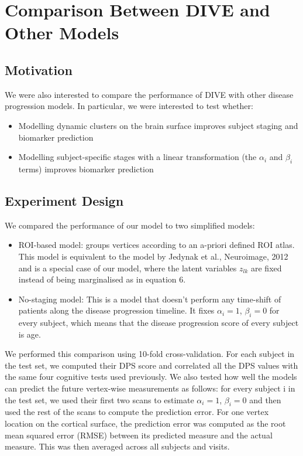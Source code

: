 \section{Comparison Between DIVE and Other Models}
\label{sec:diveCompAppendix}
 
\subsection{Motivation}

We were also interested to compare the performance of DIVE with other disease progression models. In particular, we were interested to test whether:
\begin{itemize}
 \item Modelling dynamic clusters on the brain surface improves subject staging and biomarker prediction
 \item Modelling subject-specific stages with a linear transformation (the $\alpha_i$ and $\beta_i$ terms) improves biomarker prediction
\end{itemize}


\subsection{Experiment Design}

We compared the performance of our model to two simplified models:
\begin{itemize}
 \item ROI-based model: groups vertices according to an a-priori defined ROI atlas. This model is equivalent to the model by Jedynak et al., Neuroimage, 2012 and is a special case of our model, where the latent variables $z_{lk}$ are fixed instead of being marginalised as in equation 6.
 \item No-staging model: This is a model that doesn't perform any time-shift of patients along the disease progression timeline. It fixes $\alpha_i=1$, $\beta_i=0$ for every subject, which means that the disease progression score of every subject is age.
\end{itemize}

We performed this comparison using 10-fold cross-validation. For each subject in the test set, we computed their DPS score and correlated all the DPS values with the same four cognitive tests used previously. We also tested how well the models can predict the future vertex-wise measurements as follows: for every subject i in the test set, we used their first two scans to estimate $\alpha_i=1$, $\beta_i=0$ and then used the rest of the scans to compute the prediction error. For one vertex location on the cortical surface, the prediction error was computed as the root mean squared error (RMSE) between its predicted measure and the actual measure. This was then averaged across all subjects and visits. 



